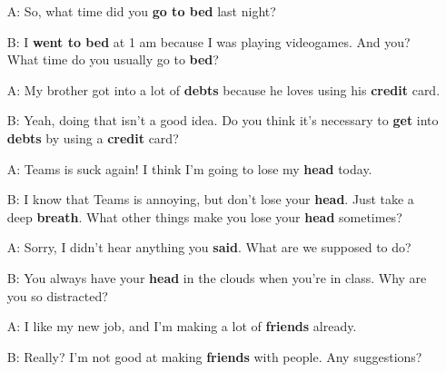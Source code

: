 \begin{itemize}
  \item[A:] So, what time did you \textbf{go to b\textcolor{fancyorange}{e}d} last night?
  \item[B:] I \textbf{w\textcolor{fancyorange}{e}nt to b\textcolor{fancyorange}{e}d} at 1 am because I was playing videogames. And you? What time do you usually go to \textbf{b\textcolor{fancyorange}{e}d}?
\end{itemize}

\begin{itemize}
  \item[A:] My brother got into a lot of \textbf{d\textcolor{fancyorange}{e}bts} because he loves using his \textbf{cr\textcolor{fancyorange}{e}dit} card.
  \item[B:] Yeah, doing that isn't a good idea. Do you think it's necessary to \textbf{g\textcolor{fancyorange}{e}t} into \textbf{d\textcolor{fancyorange}{e}bts} by using a \textbf{cr\textcolor{fancyorange}{e}dit} card?
\end{itemize}

\begin{itemize}
  \item[A:] Teams is suck again! I think I'm going to lose my \textbf{h\textcolor{fancyorange}{e}ad} today.
  \item[B:] I know that Teams is annoying, but don't lose your \textbf{h\textcolor{fancyorange}{e}ad}. Just take a deep \textbf{br\textcolor{fancyorange}{e}ath}. What other things make you lose your \textbf{h\textcolor{fancyorange}{e}ad} sometimes?
\end{itemize}

\begin{itemize}
  \item[A:] Sorry, I didn't hear anything you \textbf{s\textcolor{fancyorange}{a}id}. What are we supposed to do?
  \item[B:] You always have your \textbf{h\textcolor{fancyorange}{e}ad} in the clouds when you're in class. Why are you so distracted?
\end{itemize}

\begin{itemize}
  \item[A:] I like my new job, and I'm making a lot of \textbf{fr\textcolor{fancyorange}{ie}nds} already.
  \item[B:] Really? I'm not good at making \textbf{fr\textcolor{fancyorange}{ie}nds} with people. Any suggestions?
\end{itemize}

